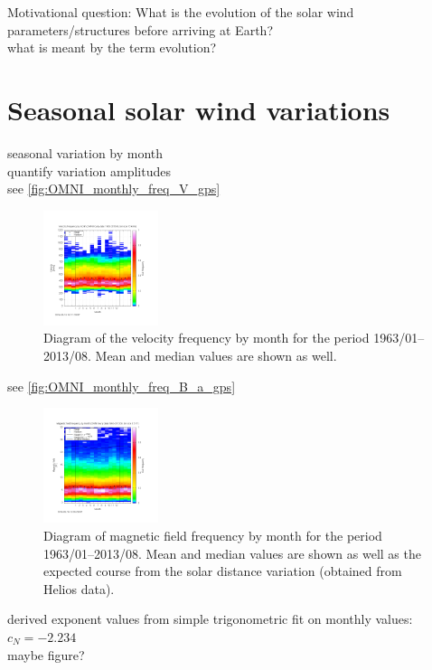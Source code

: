 Motivational question: What is the evolution of the solar wind parameters/structures before arriving at Earth?\\
what is meant by the term evolution?\\


\section{Seasonal solar wind variations}
seasonal variation by month\\
quantify variation amplitudes\\

see \autoref{fig:OMNI_monthly_freq_V_gps}
\begin{figure}[htb]
	\centering
	\includegraphics[width=0.3\textwidth]{images/gnuplots/OMNI_monthly_freq_V_gps.png}
	\caption{Diagram of the velocity frequency by month for the period 1963/01--2013/08. Mean and median values are shown as well.}
	\label{fig:OMNI_monthly_freq_V_gps}
\end{figure}

see \autoref{fig:OMNI_monthly_freq_B_a_gps}
\begin{figure}[htb]
	\centering
	\includegraphics[width=0.3\textwidth]{images/gnuplots/OMNI_monthly_freq_B_a_gps.png}
	\caption{Diagram of magnetic field frequency by month for the period 1963/01--2013/08. Mean and median values are shown as well as the expected course from the solar distance variation (obtained from Helios data).}
	\label{fig:OMNI_monthly_freq_B_a_gps}
\end{figure}

derived exponent values from simple trigonometric fit on monthly values:\\
$c_N = -2.234$\\
maybe figure?\\

